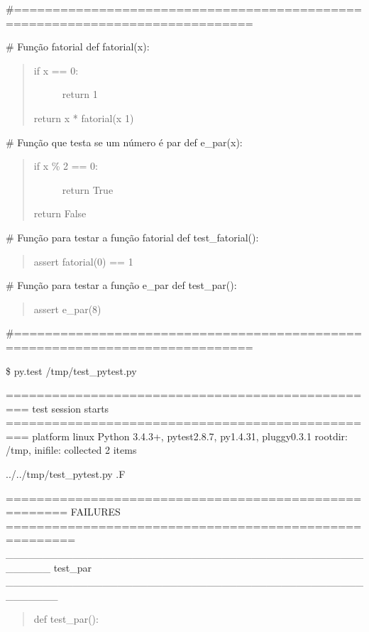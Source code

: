 \documentclass[letterpaper,10pt,brazil]{sphinxmanual}
\begin{document}
\#=============================================================================

\# Função fatorial
def fatorial(x):
\begin{quote}
\begin{description}
\item[{if x == 0:}] \leavevmode
return 1

\end{description}

return x * fatorial(x \sphinxhyphen{} 1)
\end{quote}

\# Função que testa se um número é par
def e\_par(x):
\begin{quote}
\begin{description}
\item[{if x \% 2 == 0:}] \leavevmode
return True

\end{description}

return False
\end{quote}

\# Função para testar a função fatorial
def test\_fatorial():
\begin{quote}

assert fatorial(0) == 1
\end{quote}

\# Função para testar a função e\_par
def test\_par():
\begin{quote}

assert e\_par(8)
\end{quote}

\#=============================================================================

\$ py.test /tmp/test\_pytest.py

================================================= test session starts =================================================
platform linux \textendash{} Python 3.4.3+, pytest\sphinxhyphen{}2.8.7, py\sphinxhyphen{}1.4.31, pluggy\sphinxhyphen{}0.3.1
rootdir: /tmp, inifile:
collected 2 items

../../tmp/test\_pytest.py .F

====================================================== FAILURES =======================================================
\_\_\_\_\_\_\_\_\_\_\_\_\_\_\_\_\_\_\_\_\_\_\_\_\_\_\_\_\_\_\_\_\_\_\_\_\_\_\_\_\_\_\_\_\_\_\_\_\_\_\_\_\_\_ test\_par \_\_\_\_\_\_\_\_\_\_\_\_\_\_\_\_\_\_\_\_\_\_\_\_\_\_\_\_\_\_\_\_\_\_\_\_\_\_\_\_\_\_\_\_\_\_\_\_\_\_\_\_\_\_\_
\begin{quote}

def test\_par():
\end{quote}
\end{document}
